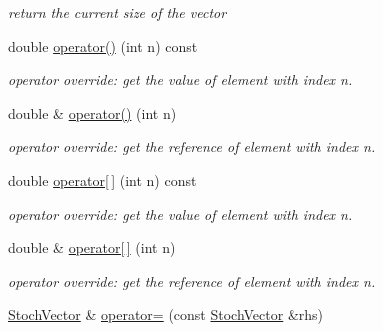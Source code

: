 \begin{CompactItemize}
\begin{CompactList}\small\item\em return the current size of the vector \item\end{CompactList}\item 
\hypertarget{class_stoch_vector_7aa3095e0fae2f8a80d60455f056c0bb}{
double \hyperlink{class_stoch_vector_7aa3095e0fae2f8a80d60455f056c0bb}{operator()} (int n) const }
\label{class_stoch_vector_7aa3095e0fae2f8a80d60455f056c0bb}

\begin{CompactList}\small\item\em operator override: get the value of element with index n. \item\end{CompactList}\item 
double \& \hyperlink{class_stoch_vector_8d73ab74149f7e7d722c36780f526593}{operator()} (int n)
\begin{CompactList}\small\item\em operator override: get the reference of element with index n. \item\end{CompactList}\item 
\hypertarget{class_stoch_vector_74d06a0707f3bcb20f8851bef7296448}{
double \hyperlink{class_stoch_vector_74d06a0707f3bcb20f8851bef7296448}{operator\mbox{[}$\,$\mbox{]}} (int n) const }
\label{class_stoch_vector_74d06a0707f3bcb20f8851bef7296448}

\begin{CompactList}\small\item\em operator override: get the value of element with index n. \item\end{CompactList}\item 
double \& \hyperlink{class_stoch_vector_acb6b0e80a7eed25129e5e7446f59937}{operator\mbox{[}$\,$\mbox{]}} (int n)
\begin{CompactList}\small\item\em operator override: get the reference of element with index n. \item\end{CompactList}\item 
\hypertarget{class_stoch_vector_a727597a18ad28613bf2cff14cdb6134}{
\hyperlink{class_stoch_vector}{StochVector} \& \hyperlink{class_stoch_vector_a727597a18ad28613bf2cff14cdb6134}{operator=} (const \hyperlink{class_stoch_vector}{StochVector} \&rhs)}
\label{class_stoch_vector_a727597a18ad28613bf2cff14cdb6134}


\end{CompactItemize}
